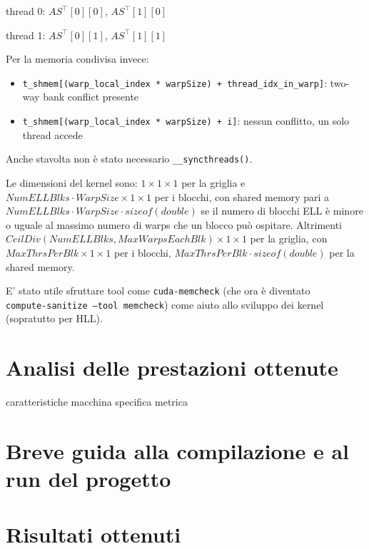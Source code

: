 \documentclass[a4paper,9pt]{extarticle}
\begin{document}
\begin{minipage}{\linewidth}
\centering
thread 0: $AS^{\top}[0][0]$, $AS^{\top}[1][0]$

thread 1: $AS^{\top}[0][1]$, $AS^{\top}[1][1]$
\end{minipage}

Per la memoria condivisa invece:
\begin{itemize}
	\item \texttt{t\_shmem[(warp\_local\_index * warpSize) + thread\_idx\_in\_warp]}: two-way bank conflict presente
	\item \texttt{t\_shmem[(warp\_local\_index * warpSize) + i]}: nessun conflitto, un solo thread accede
\end{itemize}
Anche stavolta non è stato necessario \texttt{\_\_syncthreads()}.

Le dimensioni del kernel sono: $1 \times 1 \times 1$ per la griglia e $NumELLBlks \cdot WarpSize \times 1 \times 1$ per i blocchi, con
shared memory pari a $NumELLBlks \cdot WarpSize \cdot sizeof(double)$ se il numero di blocchi ELL è minore o uguale
al massimo numero di warps che un blocco può ospitare. Altrimenti \\ 
$CeilDiv(NumELLBlks, MaxWarpsEachBlk) \times 1 \times 1$ 
per la griglia, con \\ $MaxThrsPerBlk \times 1 \times 1$  per i blocchi, $MaxThrsPerBlk \cdot sizeof(double)$ per la shared
memory.

E' stato utile sfruttare tool come \texttt{cuda-memcheck} (che ora è diventato \\ \texttt{compute-sanitize --tool memcheck})
come aiuto allo sviluppo dei kernel (sopratutto per HLL).

\section{Analisi delle prestazioni ottenute}
caratteristiche macchina
specifica metrica

\section{Breve guida alla compilazione e al run del progetto}

\pagebreak
	
\section{Risultati ottenuti}
\end{document}
